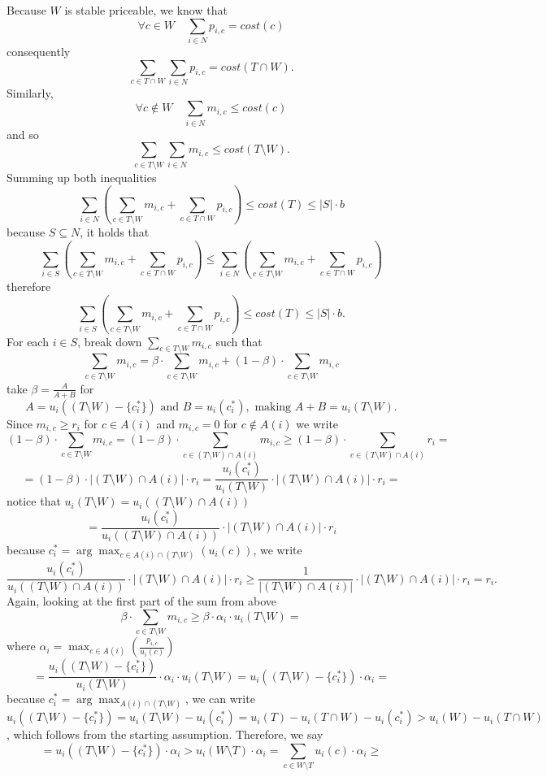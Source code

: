 Because $W$ is stable priceable, we know that
$$
\forall c \in W \quad \sum_{i\in N}p_{i,c} = cost(c)
$$
consequently
$$
\sum_{c\in T\cap W}\sum_{i\in N}p_{i,c}=cost(T\cap W).
$$
Similarly,
$$
\forall c \notin W \quad \sum_{i\in N}m_{i,c} \le cost(c)
$$
and so
$$
\sum_{c\in T\setminus W}\sum_{i\in N}m_{i,c}\le cost(T\setminus W).
$$
Summing up both inequalities
$$
\sum_{i\in N}\left(\sum_{c\in T\setminus W}m_{i,c} + \sum_{c\in T\cap W}p_{i,c}  \right) \le cost(T) \le |S|\cdot b
$$
because $S\subseteq N$, it holds that
$$
\sum_{i\in S}\left(\sum_{c\in T\setminus W}m_{i,c} + \sum_{c\in T\cap W}p_{i,c}  \right) \le \sum_{i\in N}\left(\sum_{c\in T\setminus W}m_{i,c} + \sum_{c\in T\cap W}p_{i,c}  \right)
$$
therefore
$$
\sum_{i\in S}\left(\sum_{c\in T\setminus W}m_{i,c} + \sum_{c\in T\cap W}p_{i,c}  \right) \le cost(T) \le |S|\cdot b.
$$
For each $i\in S$, break down $\sum_{c\in T\setminus W}m_{i,c}$ such that
$$
\sum_{c\in T\setminus W}m_{i,c}=\beta\cdot \sum_{c\in T\setminus W}m_{i,c} + (1-\beta)\cdot \sum_{c\in T\setminus W}m_{i,c}
$$
take $\beta=\frac{A}{A+B}$ for 
$$A=u_i((T\setminus W) - \{c_i^*\}) \text{ and } B=u_i(c_i^*), \text{ making } A+B=u_i(T\setminus W).$$ Since $m_{i,c}\ge r_i$ for $c\in A(i)$ and $m_{i,c}=0$ for $c\notin A(i)$ we write
$$
(1-\beta)\cdot \sum_{c\in T\setminus W}m_{i,c} = (1-\beta)\cdot \sum_{c\in (T\setminus W)\cap A(i)}m_{i,c} \ge (1 - \beta)\cdot \sum_{c\in (T\setminus W)\cap A(i)}r_i =
$$
$$
= (1-\beta)\cdot |(T\setminus W)\cap A(i)|\cdot r_i =\frac{u_i(c_i^*)}{u_i(T\setminus W)}\cdot |(T\setminus W)\cap A(i)|\cdot r_i=
$$
notice that $u_i(T\setminus W)=u_i((T\setminus W)\cap A(i))$
$$
=\frac{u_i(c_i^*)}{u_i((T\setminus W)\cap A(i))}\cdot |(T\setminus W)\cap A(i)|\cdot r_i
$$
because $c_i^*=\arg\max_{c\in A(i)\cap (T\setminus W)}(u_i(c))$, we write
$$
\frac{u_i(c_i^*)}{u_i((T\setminus W)\cap A(i))}\cdot |(T\setminus W)\cap A(i)|\cdot r_i \ge \frac{1}{|(T\setminus W)\cap A(i)|}\cdot |(T\setminus W)\cap A(i)|\cdot r_i=r_i.
$$
Again, looking at the first part of the sum from above
$$
\beta\cdot\sum_{c\in T\setminus W}m_{i,c}\ge \beta\cdot \alpha_i\cdot u_i(T\setminus W) =
$$
where $\alpha_i=\max_{c\in A(i)}\left(\frac{p_{i,c}}{u_i(c)} \right)$
$$
=\frac{u_i((T\setminus W)-\{c_i^*\})}{u_i(T\setminus W)}\cdot \alpha_i\cdot u_i(T\setminus W)=u_i((T\setminus W)-\{c_i^*\})\cdot \alpha_i =
$$
because $c_i^*=\arg\max_{A(i)\cap(T\setminus W)}$, we can write $u_i((T\setminus W)-\{c_i^*\})=u_i(T\setminus W)-u_i(c_i^*)=u_i(T)-u_i(T\cap W)-u_i(c_i^*)>u_i(W)-u_i(T\cap W)$, which follows from the starting assumption. Therefore, we say
$$
=u_i((T\setminus W)-\{c_i^*\})\cdot \alpha_i > u_i(W\setminus T)\cdot \alpha_i = \sum_{c\in W\setminus T}u_i(c)\cdot \alpha_i \ge 
$$
